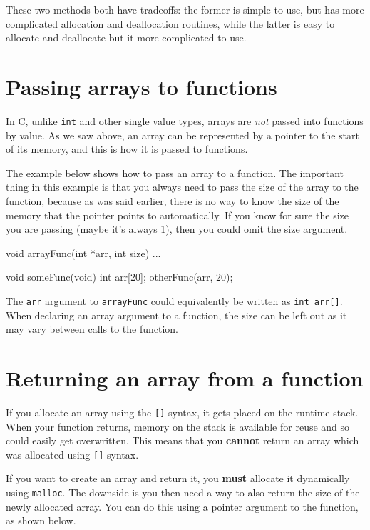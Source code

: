 These two methods both have tradeoffs: the former is simple to use, but has more complicated allocation and deallocation routines, while the latter is easy to allocate and deallocate but it more complicated to use.

\section{Passing arrays to functions}

In C, unlike \texttt{int} and other single value types, arrays are \emph{not} passed into functions by value.
As we saw above, an array can be represented by a pointer to the start of its memory, and this is how it is passed to functions.

The example below shows how to pass an array to a function.
The important thing in this example is that you always need to pass the size of the array to the function, because as was said earlier, there is no way to know the size of the memory that the pointer points to automatically.
If you know for sure the size you are passing (maybe it's always 1), then you could omit the size argument.

\begin{codeblock}
void arrayFunc(int *arr, int size) {
    ...
}


void someFunc(void) {
    int arr[20];
    otherFunc(arr, 20);
}
\end{codeblock}

The \lstinline!arr! argument to \lstinline!arrayFunc! could equivalently be written as \lstinline!int arr[]!.
When declaring an array argument to a function, the size can be left out as it may vary between calls to the function.

\section{Returning an array from a function}

If you allocate an array using the \texttt{[]} syntax, it gets placed on the runtime stack.
When your function returns, memory on the stack is available for reuse and so could easily get overwritten.
This means that you \textbf{cannot} return an array which was allocated using \texttt{[]} syntax.

If you want to create an array and return it, you \textbf{must} allocate it dynamically using \texttt{malloc}.
The downside is you then need a way to also return the size of the newly allocated array.
You can do this using a pointer argument to the function, as shown below.

